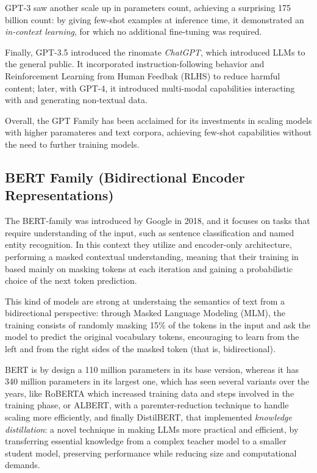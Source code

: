GPT-3 saw another scale up in parameters count, achieving a surprising 175 billion count: by giving few-shot examples at inference time, it demonstrated an \textit{in-context learning}, for which no additional fine-tuning was required.

Finally, GPT-3.5 introduced the rinomate \textit{ChatGPT}, which introduced LLMs to the general public. It incorporated instruction-following behavior and Reinforcement Learning from Human Feedbak (RLHS) to reduce harmful content; later, with GPT-4, it introduced multi-modal capabilities interacting with and generating non-textual data.

Overall, the GPT Family has been acclaimed for its investments in scaling models with higher paramateres and text corpora, achieving few-shot capabilities without the need to further training models.


\subsection{BERT Family (Bidirectional Encoder Representations)}

The BERT-family was introduced by Google in 2018, and it focuses on tasks that require understanding of the input, such as sentence classification and named entity recognition. In this context they utilize and encoder-only architecture, performing a masked contextual understanding, meaning that their training in based mainly on masking tokens at each iteration and gaining a probabilistic choice of the next token prediction.

This kind of models are strong at understaing the semantics of text from a bidirectional perspective: through Masked Language Modeling (MLM), the training consists of randomly masking 15\% of the tokens in the input and ask the model to predict the original vocabulary tokens, encouraging to learn from the left and from the right sides of the masked token (that is, bidirectional).

BERT is by design a 110 million parameters in its base version, whereas it has 340 million parameters in its largest one, which has seen several variants over the years, like RoBERTA which increased training data and steps involved in the training phase, or ALBERT, with a paremter-reduction technique to handle scaling more efficiently, and finally DistilBERT, that implemented \textit{knowledge distillation}: a novel technique in making LLMs more practical and efficient, by transferring essential knowledge from a complex teacher model to a smaller student model, preserving performance while reducing size and computational demands.


